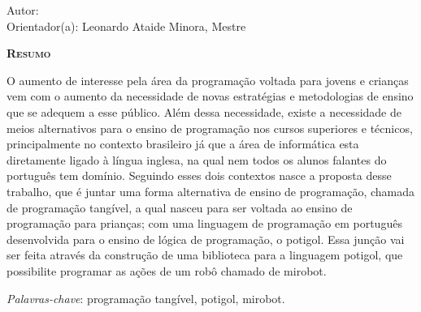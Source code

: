 \begin{center}
	{\Large{\textbf{\ABNTtitulodata}}}
\end{center}

\vspace{1cm}

\begin{flushright}
  Autor: \ABNTautordata\\
  Orientador(a): Leonardo Ataide Minora, Mestre
\end{flushright}

\vspace{1cm}

\begin{center}
	\Large{\textsc{\textbf{Resumo}}}
\end{center}

\noindent O aumento de interesse pela área da programação voltada para jovens e
crianças vem com o aumento da necessidade de novas estratégias e metodologias
de ensino que se adequem a esse público. Além dessa necessidade, existe a
necessidade de meios alternativos para o ensino de programação nos cursos
superiores e técnicos, principalmente no contexto brasileiro já que a área de
informática esta diretamente ligado à língua inglesa, na qual nem todos os
alunos falantes do português tem domínio. Seguindo esses dois contextos nasce a
proposta desse trabalho, que é juntar uma forma alternativa de ensino de
programação, chamada de programação tangível, a qual nasceu para ser voltada ao
ensino de programação para prianças; com uma linguagem de programação em
português desenvolvida para o ensino de lógica de programação, o potigol. Essa
junção vai ser feita através da construção de uma biblioteca para a linguagem
potigol, que possibilite programar as ações de um robô chamado de mirobot.

\noindent\textit{Palavras-chave}: programação tangível, potigol, mirobot.
